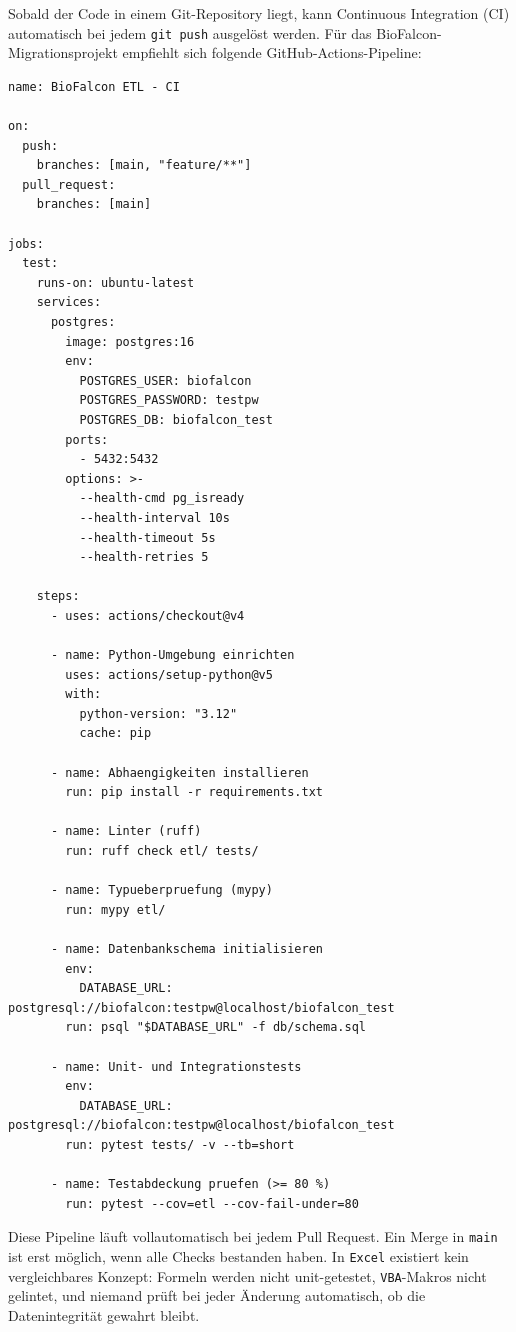 ﻿\documentclass[12pt,a4paper]{report}
\theoremstyle{definition}
\theoremstyle{remark}
\newcommand{\excel}{\texttt{Excel}}
\newcommand{\vba}{\texttt{VBA}}
\newcommand{\code}[1]{\texttt{#1}}
\begin{document}
Sobald der Code in einem Git-Repository liegt, kann Continuous Integration
(CI) automatisch bei jedem \code{git push} ausgelöst werden.
Für das BioFalcon-Migrationsprojekt empfiehlt sich folgende
GitHub-Actions-Pipeline:

\begin{lstlisting}[style=yaml, caption={.github/workflows/ci.yml -- Automatisierte Tests und Lint}]
name: BioFalcon ETL - CI

on:
  push:
    branches: [main, "feature/**"]
  pull_request:
    branches: [main]

jobs:
  test:
    runs-on: ubuntu-latest
    services:
      postgres:
        image: postgres:16
        env:
          POSTGRES_USER: biofalcon
          POSTGRES_PASSWORD: testpw
          POSTGRES_DB: biofalcon_test
        ports:
          - 5432:5432
        options: >-
          --health-cmd pg_isready
          --health-interval 10s
          --health-timeout 5s
          --health-retries 5

    steps:
      - uses: actions/checkout@v4

      - name: Python-Umgebung einrichten
        uses: actions/setup-python@v5
        with:
          python-version: "3.12"
          cache: pip

      - name: Abhaengigkeiten installieren
        run: pip install -r requirements.txt

      - name: Linter (ruff)
        run: ruff check etl/ tests/

      - name: Typueberpruefung (mypy)
        run: mypy etl/

      - name: Datenbankschema initialisieren
        env:
          DATABASE_URL: postgresql://biofalcon:testpw@localhost/biofalcon_test
        run: psql "$DATABASE_URL" -f db/schema.sql

      - name: Unit- und Integrationstests
        env:
          DATABASE_URL: postgresql://biofalcon:testpw@localhost/biofalcon_test
        run: pytest tests/ -v --tb=short

      - name: Testabdeckung pruefen (>= 80 %)
        run: pytest --cov=etl --cov-fail-under=80
\end{lstlisting}

Diese Pipeline läuft vollautomatisch bei jedem Pull Request.
Ein Merge in \code{main} ist erst möglich, wenn alle Checks
bestanden haben. In \excel{} existiert kein vergleichbares
Konzept: Formeln werden nicht unit-getestet, \vba-Makros nicht
gelintet, und niemand prüft bei jeder Änderung automatisch,
ob die Datenintegrität gewahrt bleibt.
\end{document}
